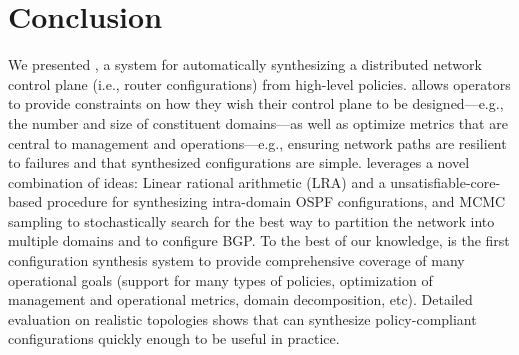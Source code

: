 \section{Conclusion}

We presented \name, a system for automatically synthesizing a
distributed network control plane (i.e., router configurations) from
high-level policies. \name allows operators to provide constraints on
how they wish their control plane to be designed---e.g., the number and size
of constituent domains---as well as optimize metrics that are
central to management and operations---e.g., ensuring network paths
are resilient to failures and that  synthesized configurations  are
simple. \name leverages a novel combination of ideas: Linear rational
arithmetic (LRA) and a unsatisfiable-core-based procedure for synthesizing
intra-domain OSPF configurations, and MCMC sampling to stochastically
search for the best way to partition the network into multiple domains
and to configure BGP. To the best of our knowledge, \name is the first
configuration synthesis system to provide comprehensive coverage of
many operational goals (support for many types of policies,
optimization of management and operational metrics, domain
decomposition, etc). Detailed evaluation on realistic topologies shows
that \name can synthesize policy-compliant configurations quickly enough to be
useful in practice.
